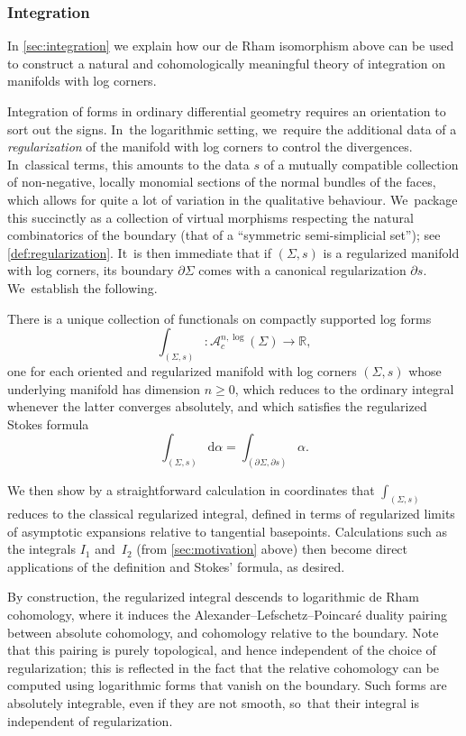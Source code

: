 \documentclass[JEP,XML,SOM,Unicode,NoFloatCountersInSection,published]{cedram}
\let\oldbullet\bullet
\renewcommand{\bullet}{{\raisebox{1pt}{$\scriptscriptstyle\oldbullet$}}}
\theoremstyle{definition}
\theoremstyle{remark}
\let\defn\emph
\newcommand{\RR}{\mathbb{R}}
\renewcommand{\ge}{\geqslant}
\newcommand{\dd}{\mathrm{d}}
\newcommand{\Alogc}[2][\bullet]{\mathscr{A}^{#1,\log}_c(#2)}
\newcommand{\Sig}{\Sigma}
\newcommand{\bdSig}[1][]{\partial^{#1}\Sigma}
\begin{document}
\subsubsection{Integration}

In \autoref{sec:integration} we explain how our de Rham isomorphism above can be used to construct a natural and cohomologically meaningful theory of integration on manifolds with log corners.

Integration of forms in ordinary differential geometry requires an orientation to sort out the signs. In~the logarithmic setting, we~require the additional data of a \defn{regularization} of the manifold with log corners to control the divergences. In~classical terms, this amounts to the data $s$ of a mutually compatible collection of non-negative, locally monomial sections of the normal bundles of the faces, which allows for quite a lot of variation in the qualitative behaviour. We~package this succinctly as a collection of virtual morphisms respecting the natural combinatorics of the boundary (that of a ``symmetric semi-simplicial set''); see \autoref{def:regularization}. It~is then immediate that if $(\Sig,s)$ is a regularized manifold with log corners, its boundary $\partial \Sig$ comes with a canonical regularization $\partial s$. We~establish the following.

\begin{theoremdefn}
There is a unique collection of functionals on compactly supported log forms
\[
\int_{(\Sig,s)} \colon \Alogc[n]{\Sig} \to \RR,
\]
one for each oriented and regularized manifold with log corners $(\Sig,s)$ whose underlying manifold has dimension $n \ge 0$, which reduces to the ordinary integral whenever the latter converges absolutely, and which satisfies the regularized Stokes formula
\[
\int_{(\Sig,s)}\dd \alpha = \int_{(\bdSig,\partial s)}\alpha.
\]
\end{theoremdefn}

We then show by a straightforward calculation in coordinates that $\int_{(\Sig,s)}$ reduces to the classical regularized integral, defined in terms of regularized limits of asymptotic expansions relative to tangential basepoints. Calculations such as the integrals $I_1$ and~$I_2$ (from \autoref{sec:motivation} above) then become direct applications of the definition and Stokes' formula, as desired.

By construction, the regularized integral descends to logarithmic de Rham cohomology, where it induces the Alexander--Lefschetz--Poincaré duality pairing between absolute cohomology, and cohomology relative to the boundary. Note that this pairing is purely topological, and hence independent of the choice of regularization; this is reflected in the fact that the relative cohomology can be computed using logarithmic forms that vanish on the boundary. Such forms are absolutely integrable, even if they are not smooth, so~that their integral is independent of regularization.
\end{document}
